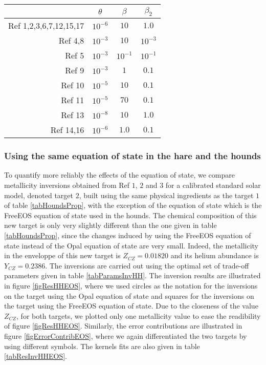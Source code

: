 \documentclass[a4paper,fleqn,usenatbib]{mnras}
\begin{document}
\begin{table*}
\caption{Trade-off parameters values for the hare-and-hounds exercises.}
\label{tabParamsInvHH}
  \centering
\begin{tabular}{r | c | c | c }
\hline
& $\theta$  & $\beta$ & $\beta_{2}$  \\ \hline
Ref 1,2,3,6,7,12,15,17 & $10 ^{-6}$ & $10$ & $1.0$ \\  
Ref 4,8 & $10 ^{-3}$ & $10$ & $10^{-3}$ \\
Ref 5 & $10 ^{-3}$ & $10^{-1}$ & $10^{-1}$ \\
Ref 9 & $10 ^{-3}$ & $1$ & $0.1$ \\
Ref 10 & $10 ^{-5}$ & $10$ &$0.1$ \\
Ref 11 & $10 ^{-5}$ & $70$ &$0.1$ \\
Ref 13 & $10 ^{-8}$ & $10$ &$1.0$ \\
Ref 14,16 & $10 ^{-6}$ & $1.0$ &$0.1$ \\ 
\hline
\end{tabular}
\end{table*}

\subsubsection{Using the same equation of state in the hare and the hounds}
To quantify more reliably the effects of the equation of state, we compare metallicity inversions obtained from Ref $1$, $2$ and $3$ for a calibrated standard solar model, denoted target $2$, built using the same physical ingredients as the target $1$ of table \ref{tabHoundsProp}, with the exception of the equation of state which is the FreeEOS equation of state used in the hounds. The chemical composition of this new target is only very slightly different than the one given in table \ref{tabHoundsProp}, since the changes induced by using the FreeEOS equation of state instead of the Opal equation of state are very small. Indeed, the metallicity in the enveloppe of this new target is $Z_{CZ}=0.01820$ and its helium abundance is $Y_{CZ}=0.2386$. The inversions are carried out using the optimal set of trade-off parameters given in table \ref{tabParamsInvHH}. The inversion results are illustrated in figure \ref{figResHHEOS}, where we used circles as the notation for the inversions on the target using the Opal equation of state and squares for the inversions on the target using the FreeEOS equation of state. Due to the closeness of the value $Z_{CZ}$, for both targets, we plotted only one metallicity value to ease the readibility of figure \ref{figResHHEOS}. Similarly, the error contributions are illustrated in figure \ref{figErrorContribEOS}, where we again differentiated the two targets by using different symbols. The kernels fits are also given in table \ref{tabResInvHHEOS}.
\end{document}
